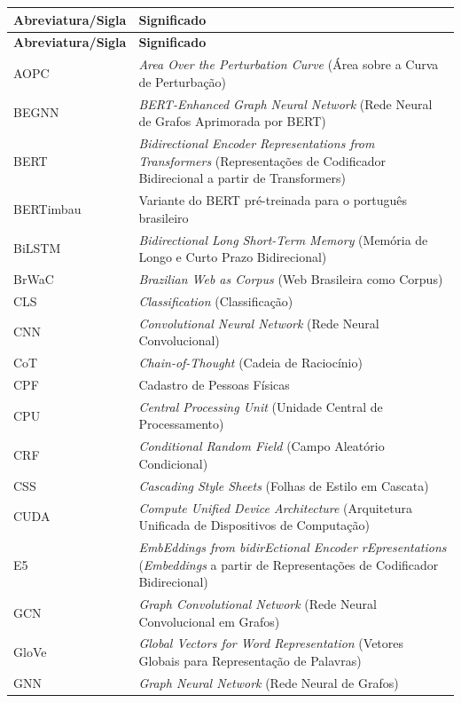 \documentclass[
    12pt,                %
    openright,           %
    oneside,             %
    a4paper,             %
    english,             %
    brazil               %
]{abntex2}
\begin{document}
\begin{longtable}{@{}p{3.8cm}p{}@{}}
\toprule
\textbf{Abreviatura/Sigla} & \textbf{Significado} \\
\midrule
\endfirsthead
\toprule
\textbf{Abreviatura/Sigla} & \textbf{Significado} \\
\midrule
\endhead
\bottomrule
\endfoot
AOPC & \textit{Area Over the Perturbation Curve} (Área sobre a Curva de Perturbação) \\
BEGNN & \textit{BERT-Enhanced Graph Neural Network} (Rede Neural de Grafos Aprimorada por BERT) \\
BERT & \textit{Bidirectional Encoder Representations from Transformers} (Representações de Codificador Bidirecional a partir de Transformers) \\
BERTimbau & Variante do BERT pré-treinada para o português brasileiro \\
BiLSTM & \textit{Bidirectional Long Short-Term Memory} (Memória de Longo e Curto Prazo Bidirecional) \\
BrWaC & \textit{Brazilian Web as Corpus} (Web Brasileira como Corpus) \\
CLS & \textit{Classification} (Classificação) \\
CNN & \textit{Convolutional Neural Network} (Rede Neural Convolucional) \\
CoT & \textit{Chain-of-Thought} (Cadeia de Raciocínio) \\
CPF & Cadastro de Pessoas Físicas \\
CPU & \textit{Central Processing Unit} (Unidade Central de Processamento) \\
CRF & \textit{Conditional Random Field} (Campo Aleatório Condicional) \\
CSS & \textit{Cascading Style Sheets} (Folhas de Estilo em Cascata) \\
CUDA & \textit{Compute Unified Device Architecture} (Arquitetura Unificada de Dispositivos de Computação) \\
E5 & \textit{EmbEddings from bidirEctional Encoder rEpresentations} (\textit{Embeddings} a partir de Representações de Codificador Bidirecional) \\
GCN & \textit{Graph Convolutional Network} (Rede Neural Convolucional em Grafos) \\
GloVe & \textit{Global Vectors for Word Representation} (Vetores Globais para Representação de Palavras) \\
GNN & \textit{Graph Neural Network} (Rede Neural de Grafos) \\

\end{longtable}
\end{document}
